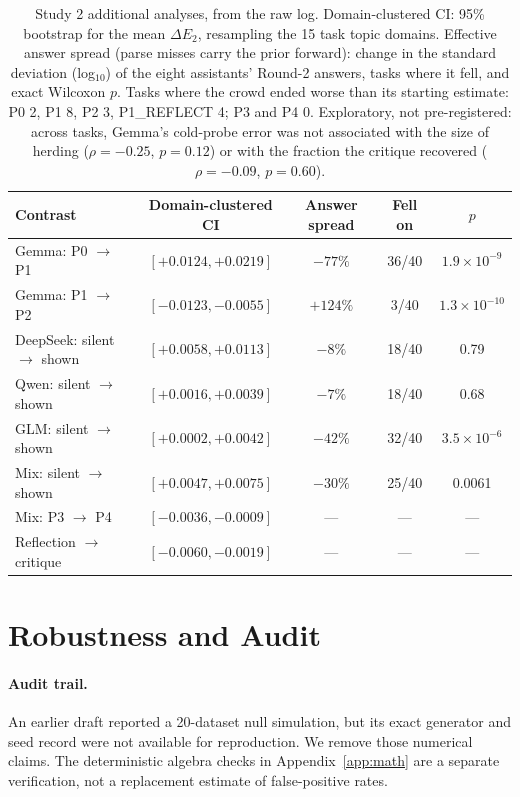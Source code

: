 \documentclass[10pt]{article}
\newenvironment{fittable}{\begin{lrbox}{\manuscripttable}}{%
\end{lrbox}\ifdim\wd\manuscripttable>\linewidth
\resizebox{\linewidth}{!}{\usebox{\manuscripttable}}%
\else\usebox{\manuscripttable}\fi}
\theoremstyle{manuscript}\newtheorem{proposition}{Proposition}
\begin{document}
\FloatBarrier

\begin{table}[ht]\centering\small\setlength{\tabcolsep}{5pt}
\caption{Study 2 additional analyses, from the raw log. Domain-clustered CI: 95\% bootstrap for the mean $\Delta E_2$, resampling the 15 task topic domains. Effective answer spread (parse misses carry the prior forward): change in the standard deviation (log$_{10}$) of the eight assistants' Round-2 answers, tasks where it fell, and exact Wilcoxon $p$. Tasks where the crowd ended worse than its starting estimate: P0 2, P1 8, P2 3, P1\_REFLECT 4; P3 and P4 0. Exploratory, not pre-registered: across tasks, Gemma's cold-probe error was not associated with the size of herding ($\rho=-0.25$, $p=0.12$) or with the fraction the critique recovered ($\rho=-0.09$, $p=0.60$).}\label{tab:s2extra}
\begin{fittable}
\begin{tabular}{@{}lcccc@{}}\toprule
Contrast & Domain-clustered CI & Answer spread & Fell on & $p$\\\midrule
Gemma: P0 $\to$ P1 & $[+0.0124,+0.0219]$ & $-77\%$ & 36/40 & $1.9\times10^{-9}$\\
Gemma: P1 $\to$ P2 & $[-0.0123,-0.0055]$ & $+124\%$ & 3/40 & $1.3\times10^{-10}$\\
DeepSeek: silent $\to$ shown & $[+0.0058,+0.0113]$ & $-8\%$ & 18/40 & 0.79\\
Qwen: silent $\to$ shown & $[+0.0016,+0.0039]$ & $-7\%$ & 18/40 & 0.68\\
GLM: silent $\to$ shown & $[+0.0002,+0.0042]$ & $-42\%$ & 32/40 & $3.5\times10^{-6}$\\
Mix: silent $\to$ shown & $[+0.0047,+0.0075]$ & $-30\%$ & 25/40 & 0.0061\\
Mix: P3 $\to$ P4 & $[-0.0036,-0.0009]$ & --- & --- & ---\\
Reflection $\to$ critique & $[-0.0060,-0.0019]$ & --- & --- & ---\\\bottomrule
\end{tabular}
\end{fittable}
\end{table}

\FloatBarrier
\section{Robustness and Audit}\label{app:robust}
\paragraph{Audit trail.} An earlier draft reported a 20-dataset null simulation, but its exact generator and seed record were not available for reproduction. We remove those numerical claims. The deterministic algebra checks in Appendix~\ref{app:math} are a separate verification, not a replacement estimate of false-positive rates.
\end{document}
